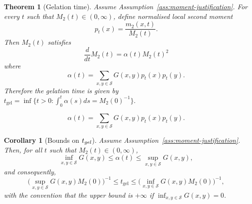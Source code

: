 \documentclass[10pt,a4paper]{amsart}
\newtheorem{thm}{Theorem}
\newtheorem{cor}{Corollary}
\begin{document}
\begin{thm}[Gelation time]
\label{thm:riccati-general}
Assume Assumption~\ref{ass:moment-justification}.
For every $t$ such that $M_2(t)\in(0,\infty)$, define normalised local second moment
\begin{equation}\label{eq:pt}
p_t(x)=\frac{m_2(x,t)}{M_2(t)}.
\end{equation}
Then $M_2(t)$ satisfies 
\begin{equation}
\label{eq:Riccati-general}
\frac{d}{dt}M_2(t)=\alpha(t)M_2(t)^2
\end{equation}
where
\begin{equation}\label{eq:alfa}
\alpha(t)=\sum_{x,y\in\mathcal S} G(x,y)p_t(x)p_t(y).
\end{equation}
Therefore the gelation time is given by
$
t_{\mathrm{gel}}
=
\inf
\Big\{
t>0:\int_0^t\alpha(s)ds=M_2(0)^{-1}
\Big\}.
$
\end{thm}

\begin{equation}
\alpha(t)=\sum_{x,y\in\mathcal S} G(x,y)p_t(x)p_t(y).
\end{equation}

\begin{cor}[Bounds on $t_{\rm gel}$]
\label{cor:sharp-bounds} Assume
Assumption~\ref{ass:moment-justification}. Then, for all $t$ such that
$M_2(t)\in(0,\infty)$,
\begin{equation}\label{eq:alpha_bound}
\inf_{x,y\in\mathcal S} G(x,y)\le \alpha(t)\le \sup_{x,y\in\mathcal S} G(x,y),
\end{equation}
and consequently,
\begin{equation}\label{bounds_Tgel}
\big(\sup_{x,y\in\mathcal S} G(x,y)M_2(0)\big)^{-1} \le t_{\mathrm{gel}} \le \big(\inf_{x,y\in\mathcal S} G(x,y)M_2(0)\big)^{-1},
\end{equation}
with the convention that the upper bound is $+\infty$ if
$\inf_{x,y\in\mathcal S} G(x,y)=0$. 
\end{cor}
\end{document}
